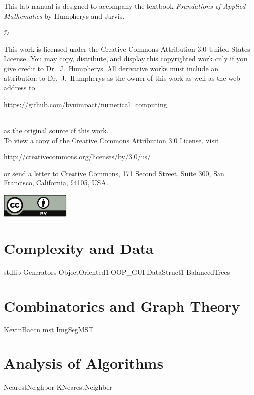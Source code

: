 \documentclass[nociteref]{newsiambook}
\begin{document}
\begin{thepreface}
This lab manual is designed to accompany the textbook \emph{Foundations of Applied Mathematics} by Humpherys and Jarvis.

\vfill
\copyright{This work is licensed under the Creative Commons Attribution 3.0 United States
License.  You may copy, distribute, and display this copyrighted work only if you give
credit to Dr.~J.~Humpherys. All derivative works must include an attribution to Dr.~J.~Humpherys as the owner of this work as well as the web address to
\\\centerline{\url{https://github.com/byuimpact/numerical_computing}}\\ as the original source of
this
work.\\To view a copy of the Creative Commons Attribution 3.0 License,
visit\\\centerline{\url{http://creativecommons.org/licenses/by/3.0/us/}} or send a letter to
Creative Commons, 171 Second Street, Suite 300, San Francisco, California, 94105, USA.}

\vfill
\centering\includegraphics[height=1.2cm]{by}
\vfill
\end{thepreface}

\setcounter{tocdepth}{1}
\tableofcontents

\mainmatter

\part{Complexity and Data}
{stdlib}
{Generators}
{ObjectOriented1}
{OOP_GUI}
{DataStruct1}
{BalancedTrees}



\part{Combinatorics and Graph Theory}
{KevinBacon}
{mst}
{ImgSegMST}

\part{Analysis of Algorithms}
{NearestNeighbor}
{KNearestNeighbor}
\end{document}
